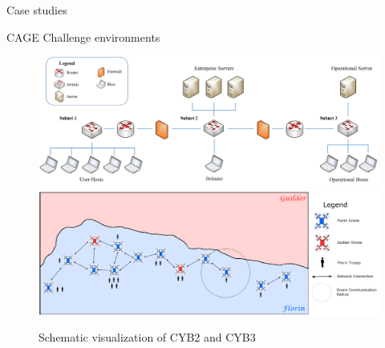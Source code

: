 \begin{frame}{Case studies}
\begin{block}{CAGE Challenge environments}
\begin{minipage}{0.7\textwidth}
\begin{figure}[H]
                \begin{minipage}{\textwidth}
                    \includegraphics[width=0.5\linewidth]{figures/cage_challenge_2.png}
                    \includegraphics[width=0.5\linewidth]{figures/cage_challenge_3.png}
                \end{minipage}

                \caption*{Schematic visualization of CYB2 and CYB3}
            \end{figure}
        \end{minipage}\hfill

    \end{block}

\end{frame}


